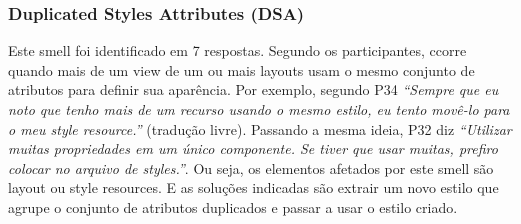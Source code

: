 




\subsubsection{Duplicated Styles Attributes (DSA)}
Este smell foi identificado em 7 respostas. Segundo os participantes, ccorre quando mais de um view de um ou mais layouts usam o mesmo conjunto de atributos para definir sua apar\^encia. Por exemplo, segundo P34 \textit{``Sempre que eu noto que tenho mais de um recurso usando o mesmo estilo, eu tento mov\^e-lo para o meu \textit{style resource}.''} (tradu\c{c}\~ao livre). Passando a mesma ideia, P32 diz \textit{``Utilizar muitas propriedades em um \'unico componente. Se tiver que usar muitas, prefiro colocar no arquivo de styles.''}. Ou seja, os elementos afetados por este smell s\~ao layout ou style resources. E as solu\c{c}\~oes indicadas s\~ao extrair um novo estilo que agrupe o conjunto de atributos duplicados e passar a usar o estilo criado.

